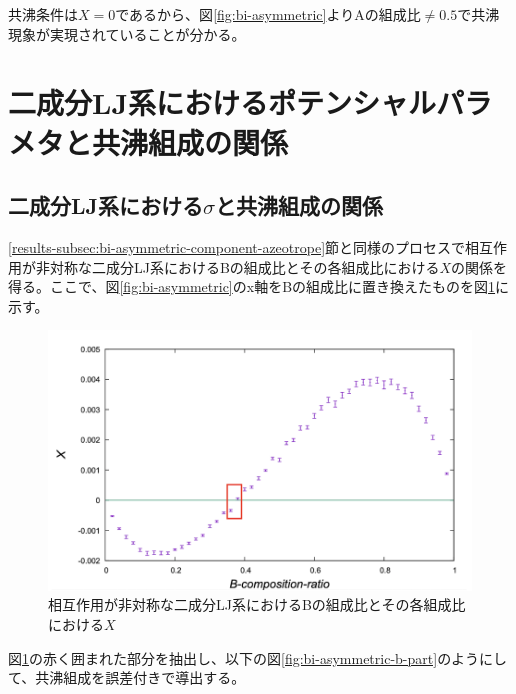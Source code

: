 \documentclass[titlepage]{jsreport}
\begin{document}
\newpage
共沸条件は$X=0$であるから、図\ref{fig:bi-asymmetric}よりAの組成比$\neq0.5$で共沸現象が実現されていることが分かる。

\section{二成分LJ系におけるポテンシャルパラメタと共沸組成の関係} \label{results-sec:bi-component-potential-parameter-azeotrope-ratio}
\subsection{二成分LJ系における$\sigma$と共沸組成の関係} \label{results-subsec:bi-component-sigma-azeotrope-ratio}
\ref{results-subsec:bi-asymmetric-component-azeotrope}節と同様のプロセスで相互作用が非対称な二成分LJ系におけるBの組成比とその各組成比における$X$の関係を得る。ここで、図\ref{fig:bi-asymmetric}のx軸をBの組成比に置き換えたものを図\ref{fig:bi-asymmetric-b}に示す。

\begin{figure}[htbp]
    \begin{center}
        \includegraphics[width=14cm]{fig/bi-asymmetric-b/L100T1.0E1.05.pdf}
    \end{center}
    \caption{相互作用が非対称な二成分LJ系におけるBの組成比とその各組成比における$X$}
    \label{fig:bi-asymmetric-b}
\end{figure}

\newpage
図\ref{fig:bi-asymmetric-b}の赤く囲まれた部分を抽出し、以下の図\ref{fig:bi-asymmetric-b-part}のようにして、共沸組成を誤差付きで導出する。
\end{document}
